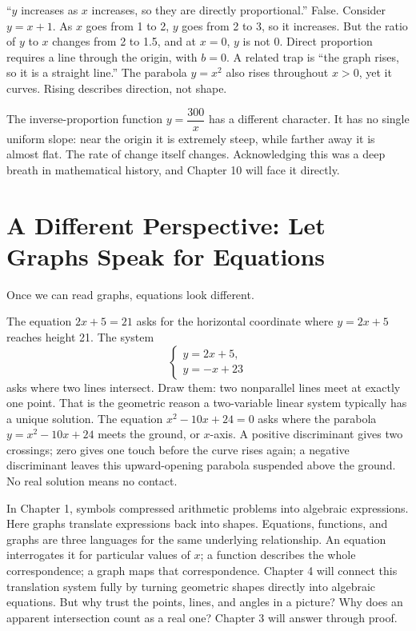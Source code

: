 \begin{fanli}
``$y$ increases as $x$ increases, so they are directly proportional.'' False. Consider $y = x + 1$. As $x$ goes from 1 to 2, $y$ goes from 2 to 3, so it increases. But the ratio of $y$ to $x$ changes from 2 to 1.5, and at $x = 0$, $y$ is not 0. Direct proportion requires a line through the origin, with $b = 0$. A related trap is ``the graph rises, so it is a straight line.'' The parabola $y = x^2$ also rises throughout $x > 0$, yet it curves. Rising describes direction, not shape.
\end{fanli}

The inverse-proportion function $y = \dfrac{300}{x}$ has a different character. It has no single uniform slope: near the origin it is extremely steep, while farther away it is almost flat. The rate of change itself changes. Acknowledging this was a deep breath in mathematical history, and Chapter 10 will face it directly.

\section{A Different Perspective: Let Graphs Speak for Equations}

Once we can read graphs, equations look different.

The equation $2x + 5 = 21$ asks for the horizontal coordinate where $y = 2x + 5$ reaches height 21. The system
\[
\begin{cases}
y = 2x + 5,\\
y = -x + 23
\end{cases}
\]
asks where two lines intersect. Draw them: two nonparallel lines meet at exactly one point. That is the geometric reason a two-variable linear system typically has a unique solution. The equation $x^2 - 10x + 24 = 0$ asks where the parabola $y = x^2 - 10x + 24$ meets the ground, or $x$-axis. A positive discriminant gives two crossings; zero gives one touch before the curve rises again; a negative discriminant leaves this upward-opening parabola suspended above the ground. No real solution means no contact.

\begin{lianjie}
In Chapter 1, symbols compressed arithmetic problems into algebraic expressions. Here graphs translate expressions back into shapes. Equations, functions, and graphs are three languages for the same underlying relationship. An equation interrogates it for particular values of $x$; a function describes the whole correspondence; a graph maps that correspondence. Chapter 4 will connect this translation system fully by turning geometric shapes directly into algebraic equations. But why trust the points, lines, and angles in a picture? Why does an apparent intersection count as a real one? Chapter 3 will answer through proof.
\end{lianjie}

